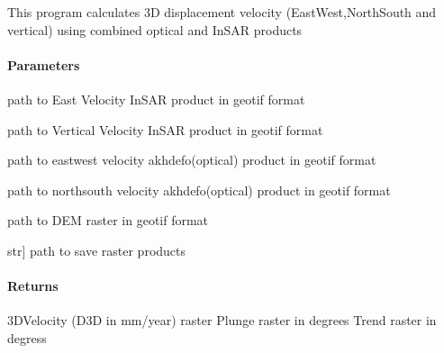 \documentclass[letterpaper,10pt,english]{sphinxmanual}
\begin{document}
\begin{fulllineitems}
\label{\detokenize{akhdefo_functions:akhdefo_functions.Akhdefo_utils.Akhdefo_inversion}}
\pysigstartsignatures
{}
\pysigstopsignatures
\sphinxAtStartPar
This program calculates 3D displacement velocity (East\sphinxhyphen{}West,North\sphinxhyphen{}South and vertical) using combined optical and InSAR products


\paragraph{Parameters}
\label{\detokenize{akhdefo_functions:id18}}\begin{description}
\sphinxAtStartPar
path to East Velocity InSAR product in geotif format

\sphinxAtStartPar
path to Vertical Velocity InSAR product in geotif format

\sphinxAtStartPar
path to east\sphinxhyphen{}west velocity  akhdefo(optical) product in geotif format

\sphinxAtStartPar
path to north\sphinxhyphen{}south velocity  akhdefo(optical) product in geotif format

\sphinxAtStartPar
path to DEM raster in geotif format

\sphinxlineitem{output\_folder}{[}str{]}
\sphinxAtStartPar
path to save raster products

\end{description}


\paragraph{Returns}
\label{\detokenize{akhdefo_functions:id19}}\begin{description}
\sphinxAtStartPar
3D\sphinxhyphen{}Velocity (D3D in mm/year) raster
Plunge raster in degrees
Trend raster in degress

\end{description}

\end{fulllineitems}
\end{document}
